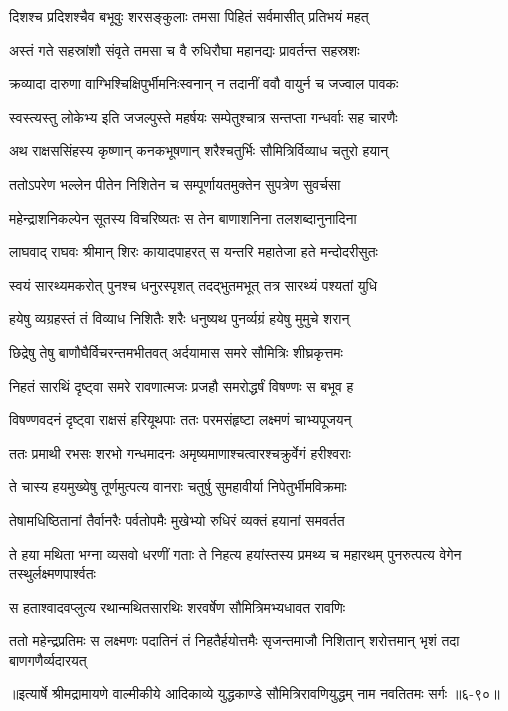 \twolineshloka
{दिशश्च प्रदिशश्चैव बभूवुः शरसङ्कुलाः}
{तमसा पिहितं सर्वमासीत् प्रतिभयं महत्} %

\twolineshloka
{अस्तं गते सहस्रांशौ संवृते तमसा च वै}
{रुधिरौघा महानद्यः प्रावर्तन्त सहस्रशः} %

\twolineshloka
{क्रव्यादा दारुणा वाग्भिश्चिक्षिपुर्भीमनिःस्वनान्}
{न तदानीं ववौ वायुर्न च जज्वाल पावकः} %

\twolineshloka
{स्वस्त्यस्तु लोकेभ्य इति जजल्पुस्ते महर्षयः}
{सम्पेतुश्चात्र सन्तप्ता गन्धर्वाः सह चारणैः} %

\twolineshloka
{अथ राक्षससिंहस्य कृष्णान् कनकभूषणान्}
{शरैश्चतुर्भिः सौमित्रिर्विव्याध चतुरो हयान्} %

\twolineshloka
{ततोऽपरेण भल्लेन पीतेन निशितेन च}
{सम्पूर्णायतमुक्तेन सुपत्रेण सुवर्चसा} %

\twolineshloka
{महेन्द्राशनिकल्पेन सूतस्य विचरिष्यतः}
{स तेन बाणाशनिना तलशब्दानुनादिना} %

\twolineshloka
{लाघवाद् राघवः श्रीमान् शिरः कायादपाहरत्}
{स यन्तरि महातेजा हते मन्दोदरीसुतः} %

\twolineshloka
{स्वयं सारथ्यमकरोत् पुनश्च धनुरस्पृशत्}
{तदद्भुतमभूत् तत्र सारथ्यं पश्यतां युधि} %

\twolineshloka
{हयेषु व्यग्रहस्तं तं विव्याध निशितैः शरैः}
{धनुष्यथ पुनर्व्यग्रं हयेषु मुमुचे शरान्} %

\twolineshloka
{छिद्रेषु तेषु बाणौघैर्विचरन्तमभीतवत्}
{अर्दयामास समरे सौमित्रिः शीघ्रकृत्तमः} %

\twolineshloka
{निहतं सारथिं दृष्ट्वा समरे रावणात्मजः}
{प्रजहौ समरोद्धर्षं विषण्णः स बभूव ह} %

\twolineshloka
{विषण्णवदनं दृष्ट्वा राक्षसं हरियूथपाः}
{ततः परमसंहृष्टा लक्ष्मणं चाभ्यपूजयन्} %

\twolineshloka
{ततः प्रमाथी रभसः शरभो गन्धमादनः}
{अमृष्यमाणाश्चत्वारश्चक्रुर्वेगं हरीश्वराः} %

\twolineshloka
{ते चास्य हयमुख्येषु तूर्णमुत्पत्य वानराः}
{चतुर्षु सुमहावीर्या निपेतुर्भीमविक्रमाः} %

\twolineshloka
{तेषामधिष्ठितानां तैर्वानरैः पर्वतोपमैः}
{मुखेभ्यो रुधिरं व्यक्तं हयानां समवर्तत} %

\threelineshloka
{ते हया मथिता भग्ना व्यसवो धरणीं गताः}
{ते निहत्य हयांस्तस्य प्रमथ्य च महारथम्}
{पुनरुत्पत्य वेगेन तस्थुर्लक्ष्मणपार्श्वतः} %

\twolineshloka
{स हताश्वादवप्लुत्य रथान्मथितसारथिः}
{शरवर्षेण सौमित्रिमभ्यधावत रावणिः} %

\twolineshloka
{ततो महेन्द्रप्रतिमः स लक्ष्मणः पदातिनं तं निहतैर्हयोत्तमैः}
{सृजन्तमाजौ निशितान् शरोत्तमान् भृशं तदा बाणगणैर्व्यदारयत्} %


॥इत्यार्षे श्रीमद्रामायणे वाल्मीकीये आदिकाव्ये युद्धकाण्डे सौमित्रिरावणियुद्धम् नाम नवतितमः सर्गः ॥६-९०॥
